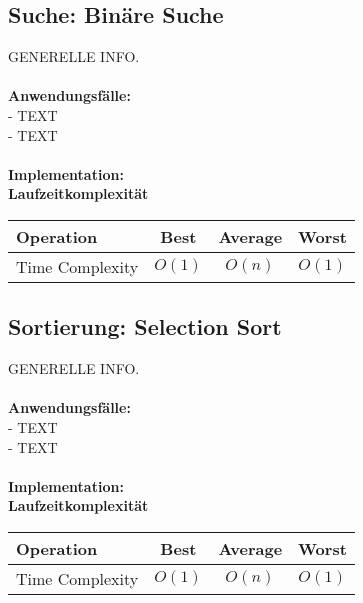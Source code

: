 \documentclass[../main.tex]{subfiles}
\begin{document}
	\subsection{Suche: Binäre Suche}
	GENERELLE INFO. \\\\
	\textbf{Anwendungsfälle:}\\
	- TEXT\\
	- TEXT\\\\
	\textbf{Implementation:}\\
	 
	\textbf{Laufzeitkomplexität}\\
	\begin{table}[ht]
		\centering
		\begin{tabular}{l *{3}{c}}
			\toprule
			Operation & Best & Average & Worst\\
			\midrule
			Time Complexity & $O(1)$ & $O(n)$ & $O(1)$\\
			\bottomrule
		\end{tabular}
	\end{table}
	\clearpage

	\subsection{Sortierung: Selection Sort}
	GENERELLE INFO. \\\\
	\textbf{Anwendungsfälle:}\\
	- TEXT\\
	- TEXT\\\\
	\textbf{Implementation:}\\
	 
	\textbf{Laufzeitkomplexität}\\
	\begin{table}[ht]
		\centering
		\begin{tabular}{l *{3}{c}}
			\toprule
			Operation & Best & Average & Worst\\
			\midrule
			Time Complexity & $O(1)$ & $O(n)$ & $O(1)$\\
			\bottomrule
		\end{tabular}
	\end{table}
	\clearpage
	
\end{document}
